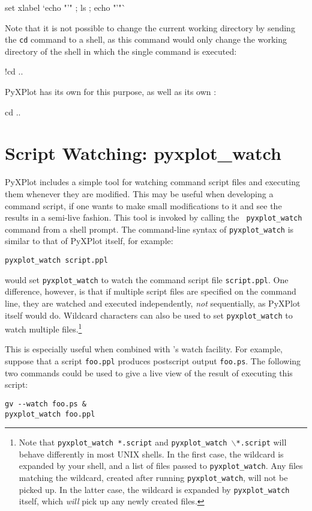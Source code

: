 \begin{dodo}
set xlabel `echo "'" ; ls ; echo "'"`
\end{dodo}

Note that it is not possible to change the current working directory by sending
the {\tt cd} command to a shell, as this command would only change the working
directory of the shell in which the single command is executed:

\begin{dontdo}
!cd ..
\end{dontdo}

\noindent PyXPlot has its own  for this purpose, as well as its own
:

\begin{dodo}
cd ..
\end{dodo}

\section{Script Watching: pyxplot\_watch}

PyXPlot includes a simple tool for watching command script files and executing
them whenever they are modified. This may be useful when developing a command
script, if one wants to make small modifications to it and see the results in a
semi-live fashion. This tool is invoked by calling the {\tt
pyxplot\_watch} command from a
shell prompt. The command-line syntax of {\tt pyxplot\_watch} is similar to
that of PyXPlot itself, for example:

\begin{verbatim}
pyxplot_watch script.ppl
\end{verbatim}

\noindent would set {\tt pyxplot\_watch} to watch the command script file
{\tt script.ppl}. One difference, however, is that if multiple script files are
specified on the command line, they are watched and executed independently,
\textit{not} sequentially, as PyXPlot itself would do. Wildcard characters can
also be used to set {\tt pyxplot\_watch} to watch multiple
files.\footnote{Note that {\tt pyxplot\_watch *.script} and
{\tt pyxplot\_watch $\backslash$*.script} will behave differently in most
UNIX shells.  In the first case, the wildcard is expanded by your shell, and a
list of files passed to {\tt pyxplot\_watch}. Any files matching the
wildcard, created after running {\tt pyxplot\_watch}, will not be picked up.
In the latter case, the wildcard is expanded by {\tt pyxplot\_watch} itself,
which {\it will} pick up any newly created files.}

This is especially useful when combined with \ghostview's
watch facility. For example, suppose that a script {\tt foo.ppl} produces
postscript output {\tt foo.ps}. The following two commands could be used to
give a live view of the result of executing this script:

\begin{verbatim}
gv --watch foo.ps &
pyxplot_watch foo.ppl
\end{verbatim}

